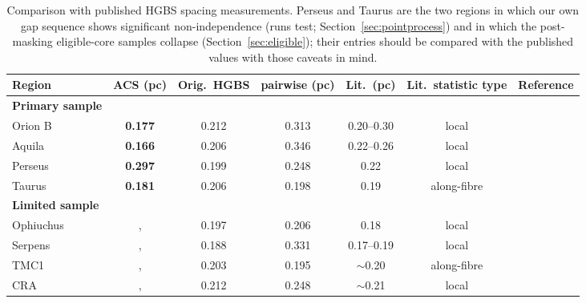 \documentclass[usenatbib,twoside,twocolumn]{mnras}
\begin{document}
\begin{table}
\caption{Comparison with published HGBS spacing measurements. Perseus and Taurus are the two regions in which our own gap sequence shows significant non-independence (runs test; Section~\ref{sec:pointprocess}) and in which the post-masking eligible-core samples collapse (Section~\ref{sec:eligible}); their entries should be compared with the published values with those caveats in mind.}
\label{tab:literature}
\setlength{\tabcolsep}{4pt}
\footnotesize
\setlength{\tabcolsep}{2.5pt}
\begin{tabular}{lcccccc}
\toprule
Region & ACS (pc) & Orig.\ HGBS & pairwise (pc) & Lit.\ (pc) & \textbf{Lit.\ statistic type} & Reference \\
\midrule
\textbf{Primary sample} &  &  &  &  &  &  \\
Orion B & \textbf{0.177} & 0.212 & 0.313 & 0.20--0.30 & local & \citet{Konyves2020} \\
Aquila  & \textbf{0.166} & 0.206 & 0.346 & 0.22--0.26 & local & \citet{Konyves2015} \\
Perseus & \textbf{0.297} & 0.199 & 0.248 & 0.22 & local & \citet{Pezzuto2021} \\
Taurus  & \textbf{0.181} & 0.206 & 0.198 & 0.19 & along-fibre & \citet{Hacar2013} \\
\midrule
\textbf{Limited sample} &  &  &  &  &  &  \\
Ophiuchus &, & 0.197 & 0.206 & 0.18 & local & \citet{Konyves2020} \\
Serpens  &, & 0.188 & 0.331 & 0.17--0.19 & local & \citet{Konyves2020} \\
TMC1     &, & 0.203 & 0.195 & $\sim$0.20 & along-fibre & \citet{Hacar2013} \\
CRA      &, & 0.212 & 0.248 & $\sim$0.21 & local & \citet{Konyves2020} \\
\bottomrule
\end{tabular}


\end{table}
\end{document}
